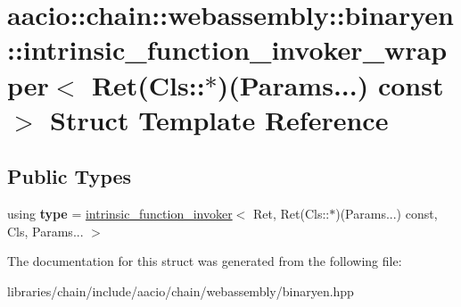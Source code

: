 \hypertarget{structaacio_1_1chain_1_1webassembly_1_1binaryen_1_1intrinsic__function__invoker__wrapper_3_01_re13338e3aad48fb7a018b3a23198d2c89}{}\section{aacio\+:\+:chain\+:\+:webassembly\+:\+:binaryen\+:\+:intrinsic\+\_\+function\+\_\+invoker\+\_\+wrapper$<$ Ret(Cls\+:\+:$\ast$)(Params...) const $>$ Struct Template Reference}
\label{structaacio_1_1chain_1_1webassembly_1_1binaryen_1_1intrinsic__function__invoker__wrapper_3_01_re13338e3aad48fb7a018b3a23198d2c89}
\subsection*{Public Types}
\begin{DoxyCompactItemize}
\item 
\mbox{\label{structaacio_1_1chain_1_1webassembly_1_1binaryen_1_1intrinsic__function__invoker__wrapper_3_01_re13338e3aad48fb7a018b3a23198d2c89_a25f2465bfc25428ffff9a3e7d0ea9ef2}} 
using {\bfseries type} = \mbox{\hyperlink{structaacio_1_1chain_1_1webassembly_1_1binaryen_1_1intrinsic__function__invoker}{intrinsic\+\_\+function\+\_\+invoker}}$<$ Ret, Ret(Cls\+::$\ast$)(Params...) const, Cls, Params... $>$
\end{DoxyCompactItemize}


The documentation for this struct was generated from the following file\+:\begin{DoxyCompactItemize}
\item 
libraries/chain/include/aacio/chain/webassembly/binaryen.\+hpp\end{DoxyCompactItemize}
